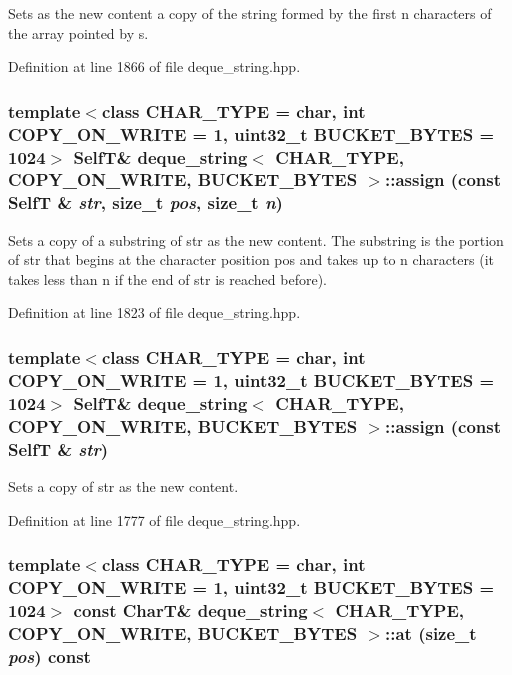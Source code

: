 Sets as the new content a copy of the string formed by the first n characters of the array pointed by s. 

Definition at line 1866 of file deque\_\-string.hpp.\hypertarget{classdeque__string_d40c73d6f33a68ca241440ec530096a8}{
\subsubsection[{assign}]{\setlength{\rightskip}{0pt plus 5cm}template$<$class CHAR\_\-TYPE  = char, int COPY\_\-ON\_\-WRITE = 1, uint32\_\-t BUCKET\_\-BYTES = 1024$>$ {\bf SelfT}\& {\bf deque\_\-string}$<$ CHAR\_\-TYPE, COPY\_\-ON\_\-WRITE, BUCKET\_\-BYTES $>$::assign (const {\bf SelfT} \& {\em str}, \/  size\_\-t {\em pos}, \/  size\_\-t {\em n})}}
\label{classdeque__string_d40c73d6f33a68ca241440ec530096a8}


Sets a copy of a substring of str as the new content. The substring is the portion of str that begins at the character position pos and takes up to n characters (it takes less than n if the end of str is reached before). 

Definition at line 1823 of file deque\_\-string.hpp.\hypertarget{classdeque__string_93be2245162d2b65148b106e457e24ae}{
\subsubsection[{assign}]{\setlength{\rightskip}{0pt plus 5cm}template$<$class CHAR\_\-TYPE  = char, int COPY\_\-ON\_\-WRITE = 1, uint32\_\-t BUCKET\_\-BYTES = 1024$>$ {\bf SelfT}\& {\bf deque\_\-string}$<$ CHAR\_\-TYPE, COPY\_\-ON\_\-WRITE, BUCKET\_\-BYTES $>$::assign (const {\bf SelfT} \& {\em str})}}
\label{classdeque__string_93be2245162d2b65148b106e457e24ae}


Sets a copy of str as the new content. 

Definition at line 1777 of file deque\_\-string.hpp.\hypertarget{classdeque__string_54e0631a4ddc10a3213bb32209798f39}{
\subsubsection[{at}]{\setlength{\rightskip}{0pt plus 5cm}template$<$class CHAR\_\-TYPE  = char, int COPY\_\-ON\_\-WRITE = 1, uint32\_\-t BUCKET\_\-BYTES = 1024$>$ const CharT\& {\bf deque\_\-string}$<$ CHAR\_\-TYPE, COPY\_\-ON\_\-WRITE, BUCKET\_\-BYTES $>$::at (size\_\-t {\em pos}) const}}
\label{classdeque__string_54e0631a4ddc10a3213bb32209798f39}


